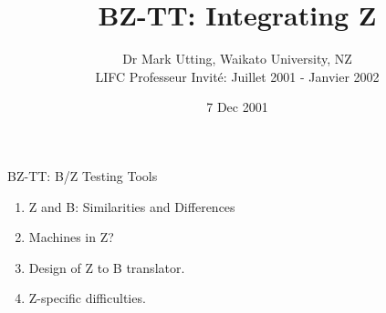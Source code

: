 

\rotateheaderstrue          %


\title{BZ-TT: Integrating Z}
\author{Dr Mark Utting, Waikato University, NZ\\
        LIFC Professeur Invit\'{e}: Juillet 2001 - Janvier 2002}
\date{7 Dec 2001}

\newcommand{\sref}[1]{SLIDE \ref{#1}}
\newcommand{\heading}[1]{\begin{center}\large\bf #1\end{center}}

\newenvironment{machine}[1]{
    \begin{tabular}{@{\qquad}l}\textbf{\kern-1em machine}\ #1\\ }{
    \\ \textbf{\kern-1em end} \end{tabular} }
\newcommand{\machineInit}{\\ \textbf{\kern-1em init} \\}
\newcommand{\machineOps}{\\ \textbf{\kern-1em ops} \\}

%
  {BZ-TT: B/Z Testing Tools \hfil\thepage}{}
\pagestyle{MH}



\maketitle          %

\begin{slide}
  \ifslidesonly              %
    \maketitle
    \addtocounter{slide}{-1}
  \fi
  \medskip
  \begin{enumerate}
    \item Z and B: Similarities and Differences
    \item Machines in Z?
    \item Design of Z to B translator.
    \item Z-specific difficulties.
  \end{enumerate}
\end{slide}



